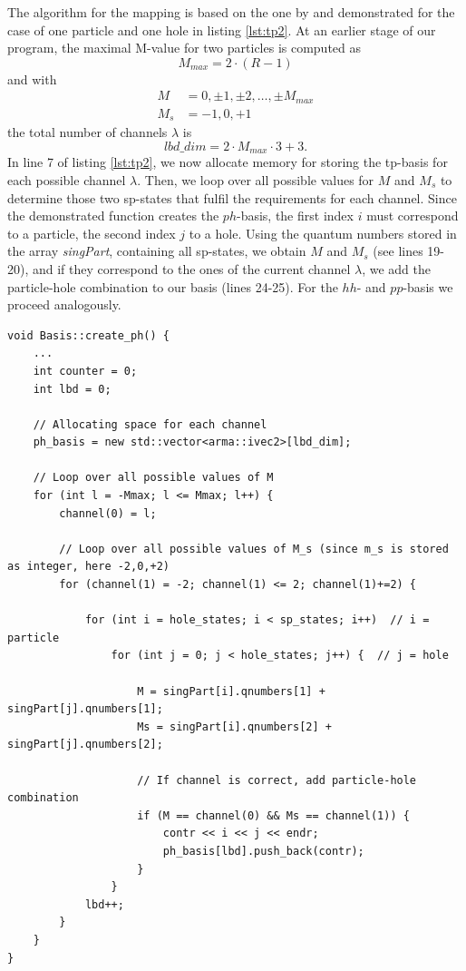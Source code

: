 The algorithm for the mapping is based on the one by \cite{Marte} and demonstrated for the case of one particle and one hole in listing \ref{lst:tp2}. At an earlier stage of our program, the maximal M-value for two particles is computed as
\[
M_{max} = 2\cdot(R-1)
\]
and with
\begin{align*}
M &= 0,\pm 1, \pm 2,\dots,\pm M_{max} \\
M_s &= -1,0,+1
\end{align*}
the total number of channels $\lambda$ is
\[
lbd\_dim = 2\cdot M_{max}\cdot 3 + 3.
\]
In line 7 of listing \ref{lst:tp2}, we now allocate memory for storing the tp-basis for each possible channel $\lambda$. Then, we loop over all possible values for $M$ and $M_s$ to determine those two sp-states that fulfil the requirements for each channel. Since the demonstrated function creates the $ph$-basis, the first index $i$ must correspond to a particle, the second index $j$ to a hole. Using the quantum numbers stored in the array \textit{singPart}, containing all sp-states, we obtain $M$ and $M_s$ (see lines 19-20), and if they correspond to the ones of the current channel $\lambda$, we add the particle-hole combination to our basis (lines 24-25). For the $hh$- and $pp$-basis we proceed analogously.



\begin{lstlisting}[float, caption={Setting up the two-particle basis for the case of one particle and one hole. A detailed explanation can be found in the text.}, label={lst:tp2}]
void Basis::create_ph() { 
    ...
    int counter = 0;
    int lbd = 0;
    
    // Allocating space for each channel 
    ph_basis = new std::vector<arma::ivec2>[lbd_dim];
     
    // Loop over all possible values of M
    for (int l = -Mmax; l <= Mmax; l++) {
        channel(0) = l;
        
        // Loop over all possible values of M_s (since m_s is stored as integer, here -2,0,+2)
        for (channel(1) = -2; channel(1) <= 2; channel(1)+=2) {

            for (int i = hole_states; i < sp_states; i++)  // i = particle
                for (int j = 0; j < hole_states; j++) {  // j = hole

                    M = singPart[i].qnumbers[1] + singPart[j].qnumbers[1];
                    Ms = singPart[i].qnumbers[2] + singPart[j].qnumbers[2];

					// If channel is correct, add particle-hole combination
                    if (M == channel(0) && Ms == channel(1)) {
                        contr << i << j << endr; 
                        ph_basis[lbd].push_back(contr);
                    }
                }          
            lbd++;
        }
    }
}
\end{lstlisting}

